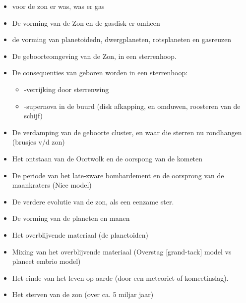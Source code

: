 \documentclass[11pt,fleqn]{book} %
\begin{document}
   
\begin{itemize} 
\item voor de zon er was, was er gas
\item De vorming van de Zon en de gasdisk er omheen
\item de vorming van planetoidedn, dwergplaneten, rotsplaneten en gasreuzen
\item De geboorteomgeving van de Zon, in een sterrenhoop.
\item De consequenties van geboren worden in een sterrenhoop:
  \begin{itemize} 
  \item    -verrijking door sterrenwing
  \item    -supernova in de buurd (disk afkapping, en omduwen, roosteren van de schijf)
  \end{itemize} 
\item De verdamping van de geboorte cluster, en waar die sterren nu rondhangen (brusjes v/d zon)
\item Het ontstaan van de Oortwolk en de oorspong van de kometen
\item De periode van het late-zware bombardement en de oorsprong van de maankraters (Nice model)
\item De verdere evolutie van de zon, als een eenzame ster.
\item De vorming van de planeten en manen
\item Het overblijvende materiaal (de planetoiden)
\item Mixing van het overblijvende materiaal (Overstag [grand-tack] model vs planeet embrio model)
\item Het einde van het leven op aarde (door een meteoriet of komeetinslag).
\item Het sterven van de zon (over ca. 5 miljar jaar)
\end{itemize}
\end{document}
